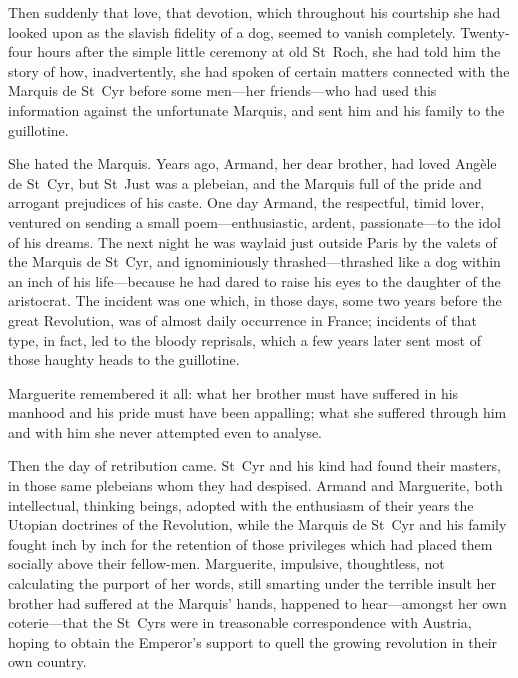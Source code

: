 Then suddenly that love, that devotion, which throughout his courtship she had looked upon as the slavish fidelity of a dog, seemed to vanish completely. Twenty-four hours after the simple little ceremony at old St~Roch, she had told him the story of how, inadvertently, she had spoken of certain matters connected with the Marquis de St~Cyr before some men\allowbreak---\allowbreak her friends\allowbreak---\allowbreak who had used this information against the unfortunate Marquis, and sent him and his family to the guillotine.

She hated the Marquis. Years ago, Armand, her dear brother, had loved Angèle de St~Cyr, but St~Just was a plebeian, and the Marquis full of the pride and arrogant prejudices of his caste. One day Armand, the respectful, timid lover, ventured on sending a small poem\allowbreak---\allowbreak enthusiastic, ardent, passionate\allowbreak---\allowbreak to the idol of his dreams. The next night he was waylaid just outside Paris by the valets of the Marquis de St~Cyr, and ignominiously thrashed\allowbreak---\allowbreak thrashed like a dog within an inch of his life\allowbreak---\allowbreak because he had dared to raise his eyes to the daughter of the aristocrat. The incident was one which, in those days, some two years before the great Revolution, was of almost daily occurrence in France; incidents of that type, in fact, led to the bloody reprisals, which a few years later sent most of those haughty heads to the guillotine.

Marguerite remembered it all: what her brother must have suffered in his manhood and his pride must have been appalling; what she suffered through him and with him she never attempted even to analyse.

Then the day of retribution came. St~Cyr and his kind had found their masters, in those same plebeians whom they had despised. Armand and Marguerite, both intellectual, thinking beings, adopted with the enthusiasm of their years the Utopian doctrines of the Revolution, while the Marquis de St~Cyr and his family fought inch by inch for the retention of those privileges which had placed them socially above their fellow-men. Marguerite, impulsive, thoughtless, not calculating the purport of her words, still smarting under the terrible insult her brother had suffered at the Marquis' hands, happened to hear\allowbreak---\allowbreak amongst her own coterie\allowbreak---\allowbreak that the St~Cyrs were in treasonable correspondence with Austria, hoping to obtain the Emperor's support to quell the growing revolution in their own country.

